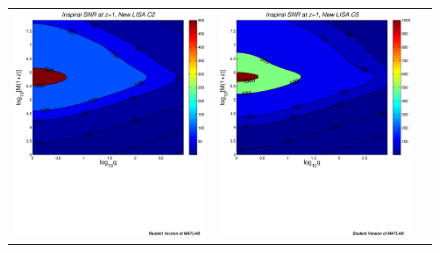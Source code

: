 \documentclass{iopart}
\begin{document}
%
\begin{figure}[htb]
\begin{center}
\begin{tabular}{ccc}
\includegraphics[scale=0.33,clip=true]{FigEmanuele/C2InspSNRContourz1.ps}
&\includegraphics[scale=0.33,clip=true]{FigEmanuele/C5InspSNRContourz1.ps}

\end{tabular}
\end{center}
\end{figure}
\end{document}
